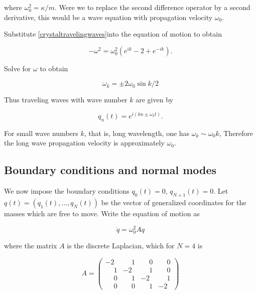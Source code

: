 where $\omega_0^2 = \kappa/m$. Were we to replace the second difference operator by a second derivative, this would be a wave equation with propagation velocity $\omega_0$.


Substitute \eqref{crystaltravelingwaves}into the equation of motion to obtain

\begin{equation}
-\omega^2 = \omega_0^2( e^{ik} - 2 + e^{-ik} ).
\end{equation}

Solve for $\omega$ to obtain

\begin{equation}
\omega_k = \pm 2\omega_0\sin k/2
\end{equation}

Thus traveling waves with wave number $k$ are given by

\begin{equation}
q_n(t) = e^{ i(kn \pm \omega_k t)}.
\end{equation}

For small wave numbers $k$, that is, long wavelength, one has $\omega_k \sim \omega_0k$, Therefore the long wave propagation velocity is approximately $\omega_0$.

\subsection{Boundary conditions and normal modes}

We now impose the boundary conditions $q_0(t) = 0$, $q_{N+1}(t) = 0$.  Let $q(t) = (q_1(t), \ldots, q_N(t))$ be the vector of generalized coordinates for the masses which are free to move. Write the equation of motion as

\begin{equation}
\ddot q = \omega_0^2 Aq
\end{equation}

where the matrix $A$ is the discrete Laplacian, which for $N = 4$ is

\begin{equation}
A =
\begin{pmatrix}
-2 & \phantom{-}1 &  \phantom{-}0 &  \phantom{-}0 \\
 \phantom{-}1 & -2 &  \phantom{-}1 &  \phantom{-}0 \\
 \phantom{-}0 &  \phantom{-}1 & -2 &  \phantom{-}1 \\
 \phantom{-}0 &  \phantom{-}0 &  \phantom{-}1 & -2
\end{pmatrix}
\end{equation}


